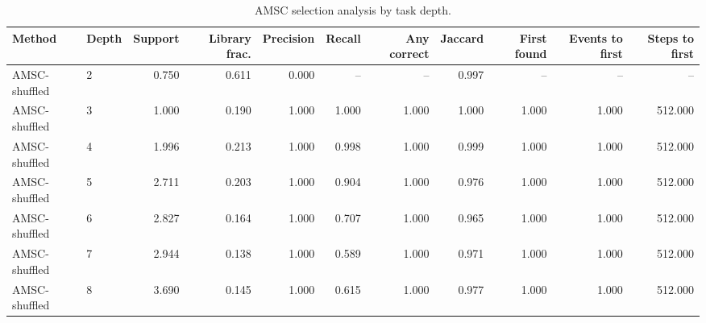 \begin{table}[ht]
    \caption{AMSC selection analysis by task depth.}
    \label{tbl:amsc_selection_depth}
    \centering
    \scriptsize
    \begin{tabular}{llrrrrrrrrr}
    \toprule
Method & Depth & Support & Library frac. & Precision & Recall & Any correct & Jaccard & First found & Events to first & Steps to first \\
    \midrule
AMSC-shuffled & 2 & 0.750 & 0.611 & 0.000 & -- & -- & 0.997 & -- & -- & -- \\
AMSC-shuffled & 3 & 1.000 & 0.190 & 1.000 & 1.000 & 1.000 & 1.000 & 1.000 & 1.000 & 512.000 \\
AMSC-shuffled & 4 & 1.996 & 0.213 & 1.000 & 0.998 & 1.000 & 0.999 & 1.000 & 1.000 & 512.000 \\
AMSC-shuffled & 5 & 2.711 & 0.203 & 1.000 & 0.904 & 1.000 & 0.976 & 1.000 & 1.000 & 512.000 \\
AMSC-shuffled & 6 & 2.827 & 0.164 & 1.000 & 0.707 & 1.000 & 0.965 & 1.000 & 1.000 & 512.000 \\
AMSC-shuffled & 7 & 2.944 & 0.138 & 1.000 & 0.589 & 1.000 & 0.971 & 1.000 & 1.000 & 512.000 \\
AMSC-shuffled & 8 & 3.690 & 0.145 & 1.000 & 0.615 & 1.000 & 0.977 & 1.000 & 1.000 & 512.000 \\
    \bottomrule
    \end{tabular}
\end{table}
